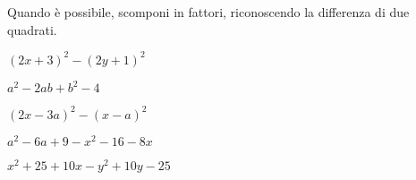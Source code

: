 
\begin{esercizio}[*]
\label{ese:div.019}
Quando è possibile, scomponi in fattori, riconoscendo la differenza di due 
quadrati.
\begin{enumeratea}
\item \((2x+3)^{2}-(2y+1)^{2}\) 
\item \(a^{2}-2{ab}+b^{2}-4\) 
\item \((2x-3a)^{2}-(x-a)^{2}\) 
\item \(a^{2}-6a+9-x^{2}-16-8x\) 
\item \(x^{2}+25+10x-y^{2}+10y-25\) 
\end{enumeratea}
\end{esercizio}

